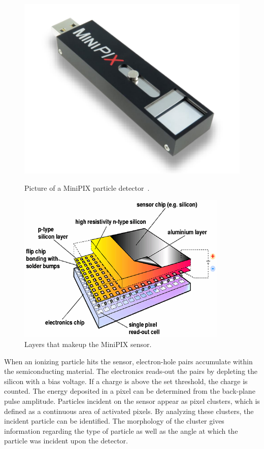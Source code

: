 \begin{figure}[H]
  \begin{minipage}[c]{0.40\linewidth}
    \includegraphics[width=\linewidth]{Figures/Minipix2.png}
    \caption{Picture of a MiniPIX particle detector~\cite{Advacam}.}
    \label{fig:Minipix}
  \end{minipage}
  \hfill
  \begin{minipage}[c]{0.45\linewidth}
    \includegraphics[width=\linewidth]{Figures/MinipixLayers.png}
    \caption{Layers that makeup the MiniPIX sensor.}
    \label{fig:MinipixLayers}
  \end{minipage}
\end{figure}

When an ionizing particle hits the sensor, electron-hole pairs accumulate within the semiconducting material. The electronics reads-out the pairs by depleting the silicon with a bias voltage. If a charge is above the set threshold, the charge is counted. The energy deposited in a pixel can be determined from the back-plane pulse amplitude. Particles incident on the sensor appear as pixel clusters, which is defined as a continuous area of activated pixels. By analyzing these clusters, the incident particle can be identified. The morphology of the cluster gives information regarding the type of particle as well as the angle at which the particle was incident upon the detector. 

